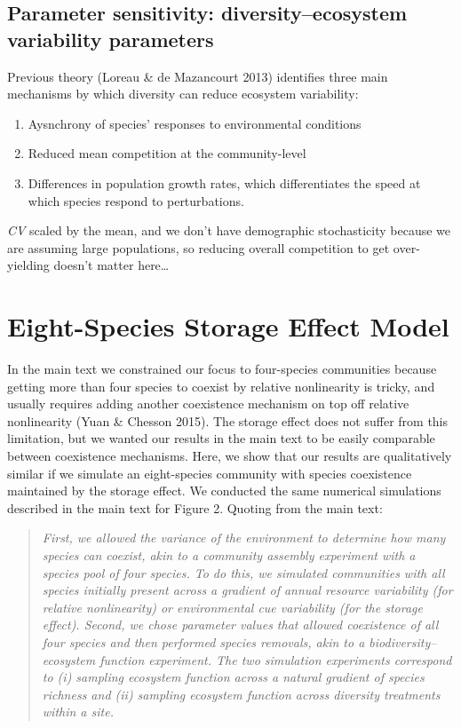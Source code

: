 \documentclass[11pt,]{article}
\providecommand{\tightlist}{%
  \setlength{\itemsep}{0pt}\setlength{\parskip}{0pt}}
\begin{document}
\subsection{Parameter sensitivity: diversity--ecosystem variability parameters}

Previous theory (Loreau \& de Mazancourt 2013) identifies three main
mechanisms by which diversity can reduce ecosystem variability:

\begin{enumerate}
\def\labelenumi{\arabic{enumi}.}
\tightlist
\item
  Aysnchrony of species' responses to environmental conditions
\item
  Reduced mean competition at the community-level
\item
  Differences in population growth rates, which differentiates the speed
  at which species respond to perturbations.
\end{enumerate}

\emph{CV} scaled by the mean, and we don't have demographic
stochasticity because we are assuming large populations, so reducing
overall competition to get over-yielding doesn't matter here\ldots{}

\section{Eight-Species Storage Effect Model}

In the main text we constrained our focus to four-species communities
because getting more than four species to coexist by relative
nonlinearity is tricky, and usually requires adding another coexistence
mechanism on top off relative nonlinearity (Yuan \& Chesson 2015). The
storage effect does not suffer from this limitation, but we wanted our
results in the main text to be easily comparable between coexistence
mechanisms. Here, we show that our results are qualitatively similar if
we simulate an eight-species community with species coexistence
maintained by the storage effect. We conducted the same numerical
simulations described in the main text for Figure 2. Quoting from the
main text:

\begin{quote}
\emph{First, we allowed the variance of the environment to determine how many species can coexist, akin to a community assembly experiment with a species pool of four species.
To do this, we simulated communities with all species initially present across a gradient of annual resource variability (for relative nonlinearity) or environmental cue variability (for the storage effect).
Second, we chose parameter values that allowed coexistence of all four species and then performed species removals, akin to a biodiversity--ecosystem function experiment.
The two simulation experiments correspond to (i) sampling ecosystem function across a natural gradient of species richness and (ii) sampling ecosystem function across diversity treatments within a site.}
\end{quote}
\end{document}

